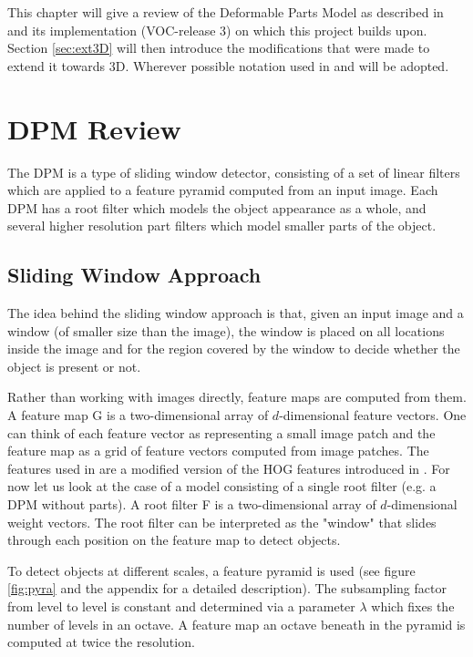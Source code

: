 This chapter will give a review of the Deformable Parts Model as described in \cite{5255236}  and its implementation (VOC-release 3) on which this project builds upon. Section \ref{sec:ext3D} will then introduce the modifications that were made to extend it towards 3D. Wherever possible notation used in \cite{5255236} and \cite{6248075} will be adopted.

\section{DPM Review}\label{sec:dpmreview}
The DPM is a type of sliding window detector, consisting of a set of linear filters which are applied to a feature pyramid computed from an input image. Each DPM has a root filter which models the object appearance as a whole, and several higher resolution part filters which model smaller parts of the object. 

\subsection{Sliding Window Approach}
The idea behind the sliding window approach is that, given an input image and a window (of smaller size than the image), the window is placed on all locations inside the image and  for the region covered by the window to decide whether the object is present or not. 

Rather than working with images directly, feature maps are computed from them. A feature map G is a two-dimensional array of $d$-dimensional feature vectors. One can think of each feature vector as representing a small image patch and the feature map as a grid of feature vectors computed from image patches. The features used in \cite{5255236} are a modified version of the HOG features introduced in \cite{1467360}.
For now let us look at the case of a model consisting of a single root filter (e.g. a DPM without parts).  A root filter F is a two-dimensional array of $d$-dimensional weight vectors. The root filter can be interpreted as the "window" that slides through each position on the feature map to detect objects. 

To detect objects at different scales, a feature pyramid is used (see figure \ref{fig:pyra} and the appendix for a detailed description). The subsampling factor from level to level is constant and determined via a parameter $\lambda$ which fixes the number of levels in an octave. A feature map an octave beneath in the pyramid is computed at twice the resolution.

